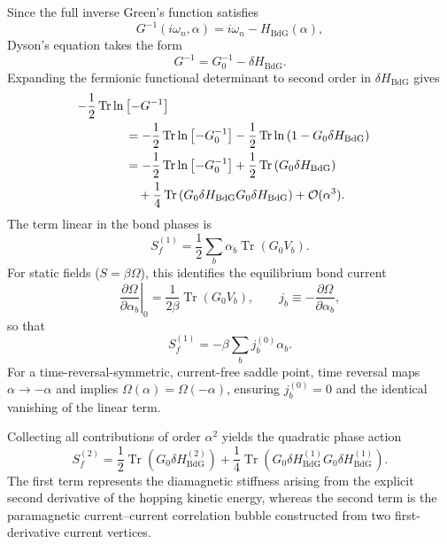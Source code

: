\documentclass[aps,prb,twocolumn,superscriptaddress,floatfix]{revtex4-2}
\newcommand{\Tr}{\operatorname{Tr}}
\begin{document}
Since the full inverse Green's function satisfies
\begin{equation}
G^{-1}(i\omega_n, \alpha) = i\omega_n - H_{\mathrm{BdG}}(\alpha),
\label{eq:A26}
\end{equation}
Dyson's equation takes the form
\begin{equation}
G^{-1} = G_0^{-1} - \delta H_{\mathrm{BdG}}.
\label{eq:A27}
\end{equation}
Expanding the fermionic functional determinant to second order in $\delta H_{\mathrm{BdG}}$ gives
\begin{equation}
\begin{aligned}
-\frac{1}{2}\Tr\ln\left[-G^{-1}\right] \\
&\hspace{-3.5em}= -\frac{1}{2}\Tr\ln\left[-G_0^{-1}\right] - \frac{1}{2}\Tr\ln\left(1 - G_0 \delta H_{\mathrm{BdG}}\right) \\
&\hspace{-3.5em}= -\frac{1}{2}\Tr\ln\left[-G_0^{-1}\right] + \frac{1}{2}\Tr\left(G_0 \delta H_{\mathrm{BdG}}\right) \\
&\hspace{-2.5em} + \frac{1}{4}\Tr\left(G_0 \delta H_{\mathrm{BdG}} G_0 \delta H_{\mathrm{BdG}}\right) + \mathcal{O}(\alpha^3).
\end{aligned}
\label{eq:A28}
\end{equation}
The term linear in the bond phases is
\begin{equation}
S_f^{(1)} = \frac{1}{2}\sum_b \alpha_b \Tr(G_0 V_b).
\label{eq:A29}
\end{equation}
For static fields ($S = \beta\Omega$), this identifies the equilibrium bond current
\begin{equation}
\left.\frac{\partial \Omega}{\partial \alpha_b}\right|_0 = \frac{1}{2\beta}\Tr(G_0 V_b), \qquad j_b \equiv -\frac{\partial \Omega}{\partial \alpha_b},
\label{eq:A30}
\end{equation}
so that
\begin{equation}
S_f^{(1)} = -\beta \sum_b j_b^{(0)} \alpha_b.
\label{eq:A31}
\end{equation}
For a time-reversal-symmetric, current-free saddle point, time reversal maps $\alpha \to -\alpha$ and implies $\Omega(\alpha) = \Omega(-\alpha)$, ensuring $j_b^{(0)} = 0$ and the identical vanishing of the linear term.

Collecting all contributions of order $\alpha^2$ yields the quadratic phase action
\begin{equation}
S_f^{(2)} = \frac{1}{2}\Tr\left(G_0 \delta H_{\mathrm{BdG}}^{(2)}\right) + \frac{1}{4}\Tr\left(G_0 \delta H_{\mathrm{BdG}}^{(1)} G_0 \delta H_{\mathrm{BdG}}^{(1)}\right).
\label{eq:A32}
\end{equation}
The first term represents the diamagnetic stiffness arising from the explicit second derivative of the hopping kinetic energy, whereas the second term is the paramagnetic current--current correlation bubble constructed from two first-derivative current vertices.
\end{document}
